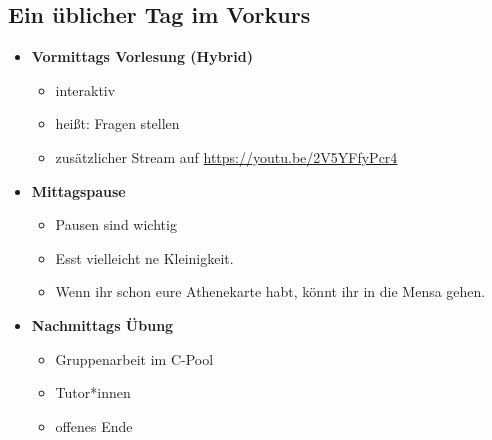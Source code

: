 \subsection{Ein üblicher Tag im Vorkurs}
\begin{frame}
    \slidehead
    \begin{itemize}
        \item \textbf{Vormittags Vorlesung (Hybrid)}
            \begin{itemize}
                \item interaktiv
                \item heißt: Fragen stellen
                \item zusätzlicher Stream auf \href{https://youtu.be/2V5YFfyPcr4}{https://youtu.be/2V5YFfyPcr4}
            \end{itemize}
            \pause
        \item \textbf{Mittagspause}
            \begin{itemize}
                \item Pausen sind wichtig
                \item Esst vielleicht ne Kleinigkeit.
                \item Wenn ihr schon eure Athenekarte habt, könnt ihr in die Mensa gehen.
            \end{itemize}
            \pause
        \item \textbf{Nachmittags Übung}
            \begin{itemize}
                \item Gruppenarbeit im C-Pool
                \item Tutor*innen
                \item offenes Ende
            \end{itemize}
    \end{itemize}
\end{frame}

